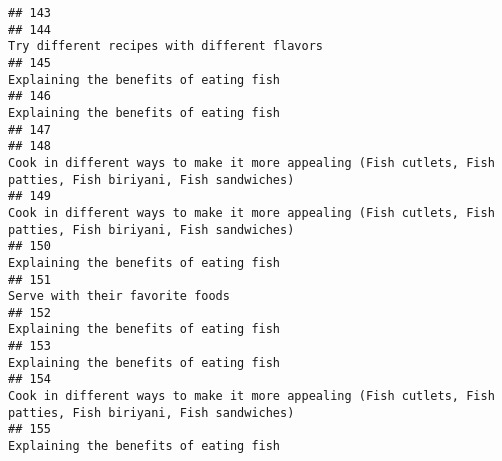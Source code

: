 \documentclass[
]{article}
\begin{document}
\begin{verbatim}
## 143                                                                                                                                                                                                             
## 144                                                                                                                                                                 Try different recipes with different flavors
## 145                                                                                                                                                                       Explaining the benefits of eating fish
## 146                                                                                                                                                                       Explaining the benefits of eating fish
## 147                                                                                                                                                                                                             
## 148                                                                                                Cook in different ways to make it more appealing (Fish cutlets, Fish patties, Fish biriyani, Fish sandwiches)
## 149                                                                                                Cook in different ways to make it more appealing (Fish cutlets, Fish patties, Fish biriyani, Fish sandwiches)
## 150                                                                                                                                                                       Explaining the benefits of eating fish
## 151                                                                                                                                                                              Serve with their favorite foods
## 152                                                                                                                                                                       Explaining the benefits of eating fish
## 153                                                                                                                                                                       Explaining the benefits of eating fish
## 154                                                                                                Cook in different ways to make it more appealing (Fish cutlets, Fish patties, Fish biriyani, Fish sandwiches)
## 155                                                                                                                                                                       Explaining the benefits of eating fish

\end{verbatim}
\end{document}

